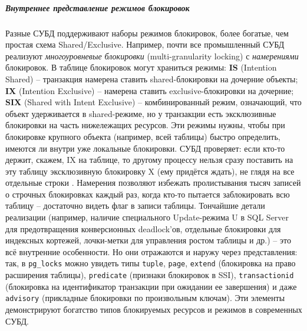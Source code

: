  \subparagraph{Внутреннее представление режимов блокировок} 
 Разные СУБД поддерживают наборы режимов блокировок, более богатые, чем простая схема Shared/Exclusive. Например, почти все промышленный СУБД реализуют \textit{многоуровневые блокировки} (multi-granularity locking) с \textit{намерениями} блокировок. В таблице блокировок могут храниться режимы: \textbf{IS} (Intention Shared) – транзакция намерена ставить shared-блокировки на дочерние объекты; \textbf{IX} (Intention Exclusive) – намерена ставить exclusive-блокировки на дочерние; \textbf{SIX} (Shared with Intent Exclusive) – комбинированный режим, означающий, что объект удерживается в shared-режиме, но у транзакции есть эксклюзивные блокировки на часть нижележащих ресурсов. Эти режимы нужны, чтобы при блокировке крупного объекта (например, всей таблицы) быстро определить, имеются ли внутри уже локальные блокировки. СУБД проверяет: если кто-то держит, скажем, IX на таблице, то другому процессу нельзя сразу поставить на эту таблицу эксклюзивную блокировку X (ему придётся ждать), не глядя на все отдельные строки \autocite{sqlhack1}. Намерения позволяют избежать пролистывания тысяч записей о строчных блокировках каждый раз, когда кто-то пытается заблокировать всю таблицу – достаточно видеть флаг в записи таблицы. Тончайшие детали реализации (например, наличие специального Update-режима U в SQL Server для предотвращения конверсионных deadlock’ов, отдельные блокировки для индексных кортежей, лочки-метки для управления ростом таблицы и др.) – это всё внутренние особенности. Но они отражаются и наружу через представления: так, в \texttt{pg\_locks} можно увидеть типы \texttt{tuple}, \texttt{page}, \texttt{extend} (блокировка на право расширения таблицы), \texttt{predicate} (признаки блокировок в SSI), \texttt{transactionid} (блокировка на идентификатор транзакции при ожидании ее завершения) и даже \texttt{advisory} (прикладные блокировки по произвольным ключам). Эти элементы демонстрируют богатство типов блокируемых ресурсов и режимов в современных СУБД.

